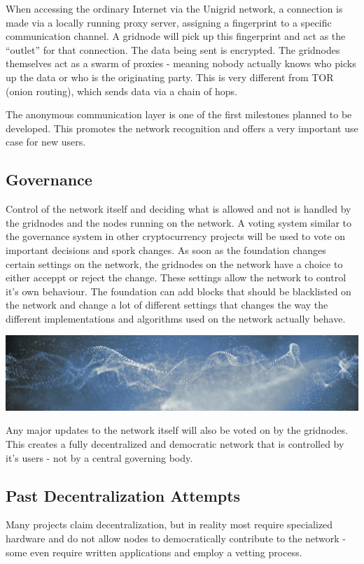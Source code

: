 \documentclass[a4paper,oneside]{article}
\begin{document}
\noindent When accessing the ordinary Internet via the Unigrid network, a connection is made via a locally running proxy server, assigning a fingerprint to a specific communication channel. A gridnode will pick up this fingerprint and act as the “outlet” for that connection. The data being sent is encrypted. The gridnodes themselves act as a swarm of proxies - meaning nobody actually knows who picks up the data or who is the originating party. This is very different from TOR (onion routing), which sends data via a chain of hops.

The anonymous communication layer is one of the first milestones planned to be developed. This promotes the network recognition and offers a very important use case for new users.

\subsection{Governance}
Control of the network itself and deciding what is allowed and not is handled by the gridnodes and the nodes running on the network. A voting system similar to the governance system in other cryptocurrency projects will be used to vote on important decisions and spork changes. As soon as the foundation changes certain settings on the network, the gridnodes on the network have a choice to either acceppt or reject the change. These settings allow the network to control it's own behaviour. The foundation can add blocks that should be blacklisted on the network and change a lot of different settings that changes the way the different implementations and algorithms used on the network actually behave.

\vspace{0.05cm}
\begin{mdframed}[style=textimage]
	\includegraphics[width=381pt]{abstract-particles}
\end{mdframed}

\noindent Any major updates to the network itself will also be voted on by the gridnodes. This creates a fully decentralized and democratic network that is controlled 
by it's users - not by a central governing body.

\subsection{Past Decentralization Attempts}
Many projects claim decentralization, but in reality most require specialized hardware and do not allow nodes to democratically contribute to the network - some even require written applications and employ a vetting process.
\end{document}
